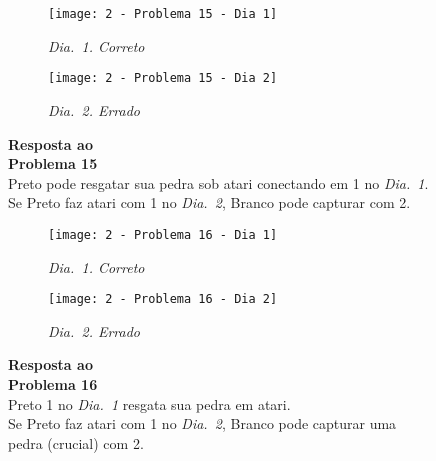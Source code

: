 \begin{SCfigure}[][h!]
    \begin{subfigure}[t]{.31\textwidth}
        \texttt{[image: 2 - Problema 15 - Dia 1]}
        \caption*{\emph{Dia.\@~1. Correto}}
    \end{subfigure}
    \hfill
    \begin{subfigure}[t]{.31\textwidth}
        \texttt{[image: 2 - Problema 15 - Dia 2]}
        \caption*{\emph{Dia.\@~2. Errado}}
    \end{subfigure}
    \hfill
    \caption*{\textbf{Resposta ao\\Problema 15}\\\vspace*{.25cm}Preto pode resgatar sua pedra sob atari conectando em 1 no \emph{Dia.\@~1}.\\\vspace*{.25cm}Se Preto faz atari com 1 no \emph{Dia.\@~2}, Branco pode capturar com 2.}
\end{SCfigure}

\pagebreak

\begin{SCfigure}[][h!]
    \begin{subfigure}[t]{.31\textwidth}
        \texttt{[image: 2 - Problema 16 - Dia 1]}
        \caption*{\emph{Dia.\@~1. Correto}}
    \end{subfigure}
    \hfill
    \begin{subfigure}[t]{.31\textwidth}
        \texttt{[image: 2 - Problema 16 - Dia 2]}
        \caption*{\emph{Dia.\@~2. Errado}}
    \end{subfigure}
    \hfill
    \caption*{\textbf{Resposta ao\\Problema 16}\\\vspace*{.25cm}Preto 1 no \emph{Dia.\@~1} resgata sua pedra em atari.\\\vspace*{.25cm}Se Preto faz atari com 1 no \emph{Dia.\@~2}, Branco pode capturar uma pedra (crucial) com 2.}
\end{SCfigure}

\vfill

